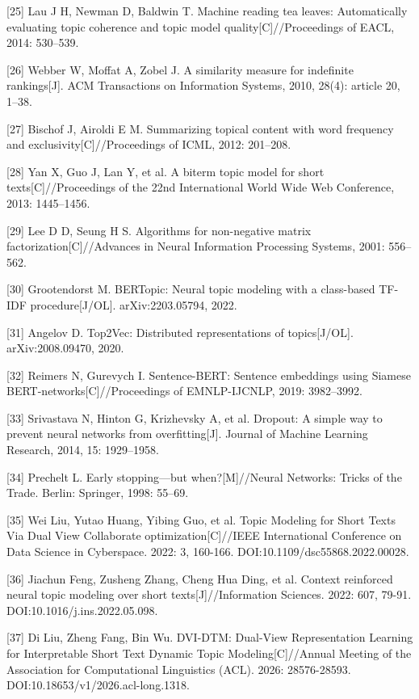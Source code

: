 \documentclass{article}
\begin{document}
[25] Lau J H, Newman D, Baldwin T. Machine reading tea leaves: Automatically evaluating topic coherence and topic model quality[C]//Proceedings of EACL, 2014: 530--539.

[26] Webber W, Moffat A, Zobel J. A similarity measure for indefinite rankings[J]. ACM Transactions on Information Systems, 2010, 28(4): article 20, 1--38.

[27] Bischof J, Airoldi E M. Summarizing topical content with word frequency and exclusivity[C]//Proceedings of ICML, 2012: 201--208.

[28] Yan X, Guo J, Lan Y, et al. A biterm topic model for short texts[C]//Proceedings of the 22nd International World Wide Web Conference, 2013: 1445--1456.

[29] Lee D D, Seung H S. Algorithms for non-negative matrix factorization[C]//Advances in Neural Information Processing Systems, 2001: 556--562.

[30] Grootendorst M. BERTopic: Neural topic modeling with a class-based TF-IDF procedure[J/OL]. arXiv:2203.05794, 2022.

[31] Angelov D. Top2Vec: Distributed representations of topics[J/OL]. arXiv:2008.09470, 2020.

[32] Reimers N, Gurevych I. Sentence-BERT: Sentence embeddings using Siamese BERT-networks[C]//Proceedings of EMNLP-IJCNLP, 2019: 3982--3992.

[33] Srivastava N, Hinton G, Krizhevsky A, et al. Dropout: A simple way to prevent neural networks from overfitting[J]. Journal of Machine Learning Research, 2014, 15: 1929--1958.

[34] Prechelt L. Early stopping---but when?[M]//Neural Networks: Tricks of the Trade. Berlin: Springer, 1998: 55--69.

[35] Wei Liu, Yutao Huang, Yibing Guo, et al. Topic Modeling for Short Texts Via Dual View Collaborate optimization[C]//IEEE International Conference on Data Science in Cyberspace. 2022: 3, 160-166. DOI:10.1109/dsc55868.2022.00028.

[36] Jiachun Feng, Zusheng Zhang, Cheng Hua Ding, et al. Context reinforced neural topic modeling over short texts[J]//Information Sciences. 2022: 607, 79-91. DOI:10.1016/j.ins.2022.05.098.

[37] Di Liu, Zheng Fang, Bin Wu. DVI-DTM: Dual-View Representation Learning for Interpretable Short Text Dynamic Topic Modeling[C]//Annual Meeting of the Association for Computational Linguistics (ACL). 2026: 28576-28593. DOI:10.18653/v1/2026.acl-long.1318.
\end{document}

